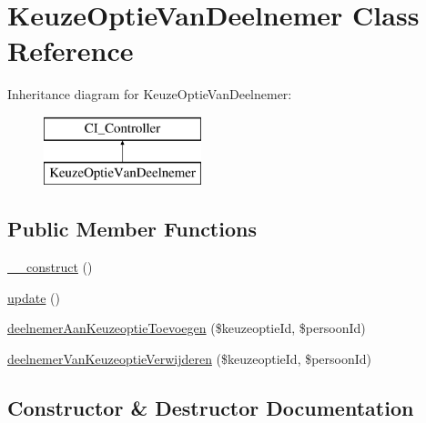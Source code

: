 \hypertarget{class_keuze_optie_van_deelnemer}{}\section{Keuze\+Optie\+Van\+Deelnemer Class Reference}
\label{class_keuze_optie_van_deelnemer}
Inheritance diagram for Keuze\+Optie\+Van\+Deelnemer\+:\begin{figure}[H]
\begin{center}
\leavevmode
\includegraphics[height=2.000000cm]{class_keuze_optie_van_deelnemer}
\end{center}
\end{figure}
\subsection*{Public Member Functions}
\begin{DoxyCompactItemize}
\item 
\mbox{\hyperlink{class_keuze_optie_van_deelnemer_a095c5d389db211932136b53f25f39685}{\+\_\+\+\_\+construct}} ()
\item 
\mbox{\hyperlink{class_keuze_optie_van_deelnemer_a842e4774e3b3601a005b995c02f7e883}{update}} ()
\item 
\mbox{\hyperlink{class_keuze_optie_van_deelnemer_a91e074d113aa641d9ca370800ca92e4b}{deelnemer\+Aan\+Keuzeoptie\+Toevoegen}} (\$keuzeoptie\+Id, \$persoon\+Id)
\item 
\mbox{\hyperlink{class_keuze_optie_van_deelnemer_a2bcf529c0ac99ca060c6dba345110341}{deelnemer\+Van\+Keuzeoptie\+Verwijderen}} (\$keuzeoptie\+Id, \$persoon\+Id)
\end{DoxyCompactItemize}


\subsection{Constructor \& Destructor Documentation}
\mbox{\label{class_keuze_optie_van_deelnemer_a095c5d389db211932136b53f25f39685}} 
